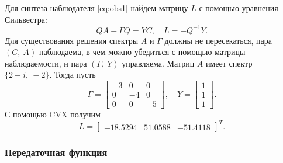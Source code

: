 Для синтеза наблюдателя \eqref{eq:obs1} найдем матрицу $L$ с помощью уравнения Сильвестра:
\begin{equation*}
    QA-\Gamma Q=YC,\quad L=-Q^{-1}Y.
\end{equation*}
Для существования решения спектры $A$ и $\Gamma$ должны не пересекаться, пара $(C,\ A)$
наблюдаема, в чем можно убедиться с помощью матрицы наблюдаемости, и пара $(\Gamma,\ Y)$ 
управляема. Матриц $A$ имеет спектр $\{2 \pm i,\ -2\}$. Тогда пусть
\begin{equation*}
    \Gamma=\begin{bmatrix}
        -3 & 0 & 0\\
        0 & -4 & 0\\
        0 & 0 & -5
    \end{bmatrix},\quad
    Y=\begin{bmatrix}
        1\\1\\1
    \end{bmatrix}.
\end{equation*}
С помощью CVX получим
\begin{equation*}
    L=\begin{bmatrix}
        -18.5294&51.0588&-51.4118
    \end{bmatrix}^T.
\end{equation*}

\subsubsection{Передаточная функция}

